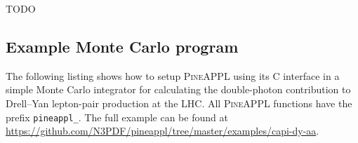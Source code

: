 TODO

\subsection{Example Monte Carlo program}
\label{app:example-program}



The following listing shows how to setup \textsc{PineAPPL} using its C interface in a simple Monte Carlo integrator for calculating the double-photon contribution to Drell--Yan lepton-pair production at the LHC.
All \textsc{PineAPPL} functions have the prefix \texttt{pineappl\_}.
The full example can be found at \url{https://github.com/N3PDF/pineappl/tree/master/examples/capi-dy-aa}.

